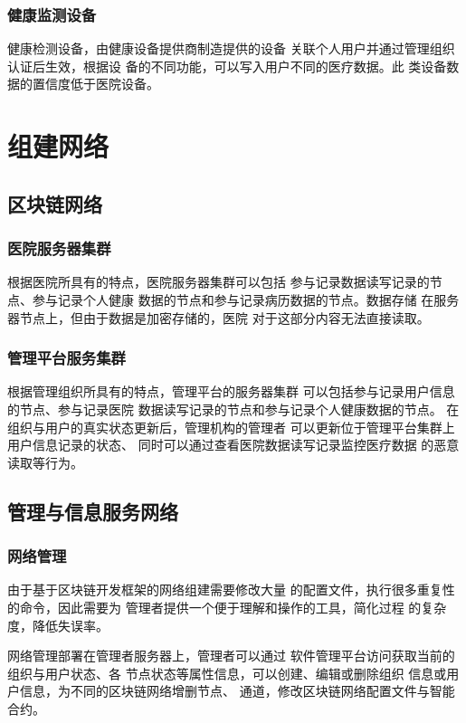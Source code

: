 \documentclass[UTF8]{ctexart}
\begin{document}
    \subsubsection{健康监测设备}
    \par
    健康检测设备，由健康设备提供商制造提供的设备
    关联个人用户并通过管理组织认证后生效，根据设
    备的不同功能，可以写入用户不同的医疗数据。此
    类设备数据的置信度低于医院设备。

    \section{组建网络}
    \subsection{区块链网络}
    \subsubsection{医院服务器集群}
    \par
    根据医院所具有的特点，医院服务器集群可以包括
    参与记录数据读写记录的节点、参与记录个人健康
    数据的节点和参与记录病历数据的节点。数据存储
    在服务器节点上，但由于数据是加密存储的，医院
    对于这部分内容无法直接读取。
    \subsubsection{管理平台服务集群}
    \par
    根据管理组织所具有的特点，管理平台的服务器集群
    可以包括参与记录用户信息的节点、参与记录医院
    数据读写记录的节点和参与记录个人健康数据的节点。
    在组织与用户的真实状态更新后，管理机构的管理者
    可以更新位于管理平台集群上用户信息记录的状态、
    同时可以通过查看医院数据读写记录监控医疗数据
    的恶意读取等行为。
    \subsection{管理与信息服务网络}
    \subsubsection{网络管理}
    \par
    由于基于区块链开发框架的网络组建需要修改大量
    的配置文件，执行很多重复性的命令，因此需要为
    管理者提供一个便于理解和操作的工具，简化过程
    的复杂度，降低失误率。
    \par
    网络管理部署在管理者服务器上，管理者可以通过
    软件管理平台访问获取当前的组织与用户状态、各
    节点状态等属性信息，可以创建、编辑或删除组织
    信息或用户信息，为不同的区块链网络增删节点、
    通道，修改区块链网络配置文件与智能合约。
\end{document}
